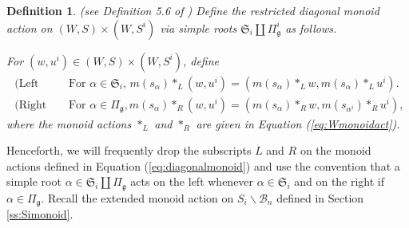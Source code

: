 \documentclass[12pt]{amsart}
\numberwithin{equation}{section}
\newtheorem{dfn}[thm]{Definition}
\newcommand{\fk}{\mbox{${\mathfrak k}$}}
\newcommand{\fg}{\mbox{${\mathfrak g}$}}
\newcommand{\B}{\mathcal{B}}
\begin{document}
\begin{dfn}\label{d:diagonal}\emph{(see Definition 5.6 of \cite{Siorbits})}
Define the \emph{restricted diagonal monoid action} on $(W,S)\times (W,S^{i})$ via simple roots $\mathfrak{S}_i\coprod \Pi_{\fg}^{i}$ as follows. 

  
For $(w,u^{i})\in (W,S)\times (W,S^{i})$, define
\begin{equation}\label{eq:diagonalmonoid}
\begin{split}
\mbox{ (Left action)} &\mbox{ For } \alpha\in\mathfrak{S}_i,\, m(s_{\alpha})*_{L}(w,u^{i})=(m(s_{\alpha})*_{L}w, m(s_{\alpha})*_{L}u^{i}).\\
\mbox{ (Right action)} &\mbox{ For } \alpha\in\Pi_{\fg}, m(s_{\alpha})*_{R}(w,u^{i})=(m(s_{\alpha})*_{R}w, m(s_{\alpha^{i}})*_{R}u^{i}),
\end{split}
\end{equation}
where the monoid actions $*_{L}$ and $*_{R}$ are given in Equation (\ref{eq:Wmonoidact}).
\end{dfn}
Henceforth, we will frequently drop the subscripts $L$ and $R$ on the monoid actions defined in Equation (\ref{eq:diagonalmonoid}) and use the convention that a simple root $\alpha\in\mathfrak{S}_i\coprod \Pi_{\fg}$ acts on the left whenever $\alpha\in \mathfrak{S}_i$ and on the right if $\alpha\in\Pi_{\fg}$. 
 Recall the extended monoid action on $S_{i}\backslash\B_{n}$ defined in Section \ref{ss:Simonoid}.  

\end{document}
